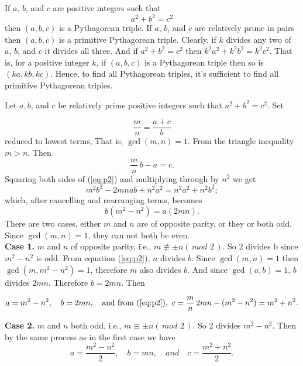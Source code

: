 \documentclass[12pt]{article}
\begin{document}
If $a,\,b$, and $c$ are positive integers such that
\begin{equation}
\label{eq:p1}
    a^2+b^2=c^2
\end{equation}
then $(a,b,c)$ is a Pythagorean triple. If $a,\,b$, and $c$ are
relatively prime in pairs then $(a,b,c)$ is a primitive
Pythagorean triple. Clearly, if $k$ divides any two of $a,\,b$,
and $c$ it divides all three. And if $a^2+b^2=c^2$ then
$k^2a^2+k^2b^2=k^2c^2$. That is, for a positive integer $k$, if
$(a,b,c)$ is a Pythagorean triple then so is $(ka,kb,kc)$.
Hence, to find all Pythagorean triples, it's sufficient to find
all primitive Pythagorean triples.

Let $a, b$, and $c$ be relatively prime positive integers such
that $a^2+b^2=c^2$. Set

$$\frac{m}{n}=\frac{a+c}{b}$$ reduced to
lowest terms, That is, $\gcd(m,n)=1$. From the triangle inequality
$m > n$. Then
\begin{equation}
    \frac{m}{n}\,b-a=c.
\label{eq:p2}
\end{equation}
Squaring both sides of (\ref{eq:p2}) and multiplying through by $n^2$
we get
\[
    m^2b^2-2mnab+n^2a^2=n^2a^2+n^2b^2;
\]
which, after cancelling and rearranging terms, becomes
\begin{equation}
    b\left(m^2-n^2\right)=a(2mn).
\label{eq:p3}
\end{equation}
There are two cases, either $m$ and $n$ are of opposite parity, or
they or both odd. Since $\gcd(m,n)=1$, they can not both be
even.\\[3pt]


 \textbf{Case 1.}     $m$ and $n$ of opposite parity, i.e., $m
\not\equiv \pm n (\, mod \,\,2\, )$. So 2 divides b since
$m^2-n^2$ is odd. From equation (\ref{eq:p2}), $n$ divides $b$.
Since $\gcd(m,n)=1$ then $\gcd(m,m^2-n^2)=1$, therefore $m$ also
divides $b$. And since $\gcd(a,b)=1$, $b$ divides $2mn$. Therefore
$b=2mn$. Then

\begin{equation}
    a=m^2-n^2,  \quad b=2mn,\quad \mbox{and from
    (\ref{eq:p2})},\,\, c=\frac{m}{n}\,2mn-(m^2-n^2)=m^2+n^2.
\label{eq:p4}
\end{equation}

\textbf{Case 2.} $m$ and $n$ both odd, i.e., $m \equiv \pm n (\,
mod \,\,2\, )$. So 2 divides $m^2-n^2$. Then by the same process
as in the first case we have
\begin{equation}
    a=\frac{m^2-n^2}{2}, \quad b=mn,\quad and \quad
    c=\frac{m^2+n^2}{2}.
\label{eq:p5}
\end{equation}
\end{document}
